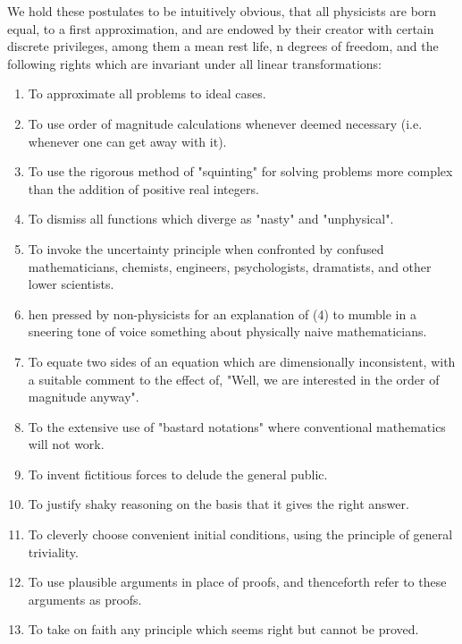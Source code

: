 We hold these postulates to be intuitively obvious, that all physicists are born equal, to a first approximation, and are endowed by their creator with certain discrete privileges, among them a mean rest life, n degrees of freedom, and the following rights which are invariant under all linear transformations:
\begin{enumerate}
	\item To approximate all problems to ideal cases.

	\item To use order of magnitude calculations whenever deemed necessary (i.e. whenever one can get away with it).

	\item To use the rigorous method of "squinting" for solving problems more complex than the addition of positive real integers.

	\item To dismiss all functions which diverge as "nasty" and "unphysical".

	\item To invoke the uncertainty principle when confronted by confused mathematicians, chemists, engineers, psychologists, dramatists, and other lower scientists.

	\item hen pressed by non-physicists for an explanation of (4) to mumble in a sneering tone of voice something about physically naive mathematicians.

	\item To equate two sides of an equation which are dimensionally inconsistent, with a suitable comment to the effect of, "Well, we are interested in the order of magnitude anyway".

	\item To the extensive use of "bastard notations" where conventional mathematics will not work.

	\item To invent fictitious forces to delude the general public. 

	\item To justify shaky reasoning on the basis that it gives the right answer.

	\item To cleverly choose convenient initial conditions, using the principle of general triviality.

	\item To use plausible arguments in place of proofs, and thenceforth refer to these arguments as proofs.

	\item To take on faith any principle which seems right but cannot be proved.
\end{enumerate}

